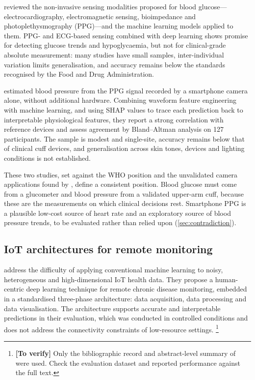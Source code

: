 \documentclass[12pt,a4paper,oneside]{report}
\newcommand{\verify}[1]{\footnote{\textbf{[To verify]} #1}}
\begin{document}
\Textcite{alhaddad2022} reviewed the non-invasive sensing modalities proposed for blood glucose---electrocardiography, electromagnetic sensing, bioimpedance and photoplethysmography (PPG)---and the machine learning models applied to them. PPG- and ECG-based sensing combined with deep learning shows promise for detecting glucose trends and hypoglycaemia, but not for clinical-grade absolute measurement: many studies have small samples, inter-individual variation limits generalisation, and accuracy remains below the standards recognised by the Food and Drug Administration.

\Textcite{liu2025ppg} estimated blood pressure from the PPG signal recorded by a smartphone camera alone, without additional hardware. Combining waveform feature engineering with machine learning, and using SHAP values to trace each prediction back to interpretable physiological features, they report a strong correlation with reference devices and assess agreement by Bland--Altman analysis on 127 participants. The sample is modest and single-site, accuracy remains below that of clinical cuff devices, and generalisation across skin tones, devices and lighting conditions is not established.

These two studies, set against the WHO position and the unvalidated camera applications found by \textcite{alessa2019}, define a consistent position. Blood glucose must come from a glucometer and blood pressure from a validated upper-arm cuff, because these are the measurements on which clinical decisions rest. Smartphone PPG is a plausible low-cost source of heart rate and an exploratory source of blood pressure trends, to be evaluated rather than relied upon (\cref{sec:contradiction}).

\subsection{IoT architectures for remote monitoring}

\Textcite{tai2024} address the difficulty of applying conventional machine learning to noisy, heterogeneous and high-dimensional IoT health data. They propose a human-centric deep learning technique for remote chronic disease monitoring, embedded in a standardised three-phase architecture: data acquisition, data processing and data visualisation. The architecture supports accurate and interpretable predictions in their evaluation, which was conducted in controlled conditions and does not address the connectivity constraints of low-resource settings.%
\verify{Only the bibliographic record and abstract-level summary of \textcite{tai2024} were used. Check the evaluation dataset and reported performance against the full text.}
\end{document}
